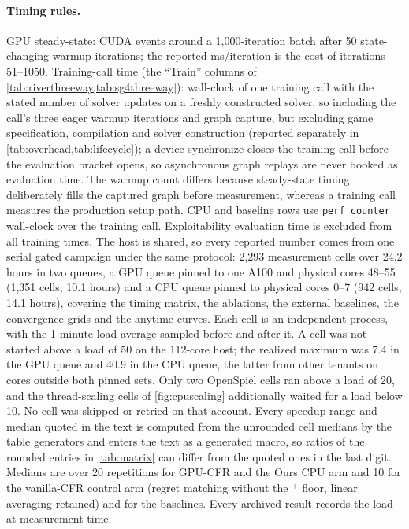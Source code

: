 \paragraph{Timing rules.}
GPU steady-state: CUDA events around a 1{,}000-iteration batch after 50
state-changing warmup iterations; the reported ms/iteration is the cost of iterations
51--1050. Training-call time (the ``Train'' columns of
\cref{tab:riverthreeway,tab:sg4threeway}): wall-clock of one training call with the
stated number of solver updates on a freshly constructed solver, so including the
call's three eager warmup iterations and graph capture,
but excluding game specification, compilation and solver construction (reported
separately in \cref{tab:overhead,tab:lifecycle}); a device
synchronize closes the training call before the evaluation bracket opens, so
asynchronous graph replays are never booked as evaluation time. The
warmup count differs because steady-state timing deliberately fills the captured
graph before measurement, whereas a training call measures the production setup
path. CPU and baseline
rows use \texttt{perf\_\allowbreak counter} wall-clock over the training call. Exploitability evaluation
time is excluded from all training times. The host is shared, so every reported number
comes from one serial gated campaign under the same protocol: 2{,}293 measurement cells
over 24.2 hours in two queues, a GPU queue pinned to one A100 and physical cores 48--55
(1{,}351 cells, 10.1 hours) and a CPU queue pinned to physical cores 0--7 (942 cells,
14.1 hours), covering the timing matrix, the ablations, the external baselines, the
convergence grids and the anytime curves.
Each cell is an independent process, with the 1-minute load average sampled before and
after it. A cell was not started above a load of 50 on the 112-core host; the realized
maximum was 7.4 in the GPU queue and 40.9 in the CPU queue, the latter from other
tenants on cores outside both pinned sets. Only two OpenSpiel cells ran above a load of
20, and the thread-scaling cells of \cref{fig:cpuscaling} additionally waited for a
load below 10. No cell was skipped or retried on that account.
Every speedup range and median quoted in the text is computed from the unrounded
cell medians by the table generators and enters the text as a generated macro, so
ratios of the rounded entries in \cref{tab:matrix} can differ from the quoted ones
in the last digit. Medians are over 20 repetitions for
GPU-CFR and the Ours CPU arm and 10 for the
vanilla-CFR control arm (regret matching without the $^{+}$ floor, linear averaging
retained) and for the baselines. Every archived result records the load at measurement time.

